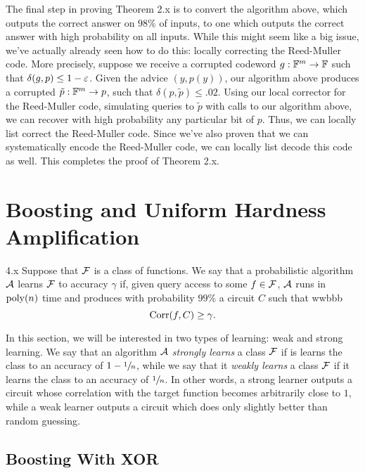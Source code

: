 \documentclass[11pt]{article}
\begin{document}
The final step in proving Theorem 2.x is to convert the algorithm above, which outputs the correct answer on $98$\% of inputs, to one which outputs the correct answer with high probability on all inputs. While this might seem like a big issue, we've actually already seen how to do this: locally correcting the Reed-Muller code. More precisely, suppose we receive a corrupted codeword $g : \mathbb{F}^m \rightarrow \mathbb{F}$ such that $\delta(g, p) \leq 1 - \varepsilon$. Given the advice $(y, p(y))$, our algorithm above produces a corrupted $\tilde{p} : \mathbb{F}^m \rightarrow p$, such that $\delta(p, \tilde{p}) \leq .02$. Using our local corrector for the Reed-Muller code, simulating queries to $\tilde{p}$ with calls to our algorithm above, we can recover with high probability any particular bit of $p$. Thus, we can locally list correct the Reed-Muller code. Since we've also proven that we can systematically encode the Reed-Muller code, we can locally list decode this code as well. This completes the proof of Theorem 2.x.

\section{Boosting and Uniform Hardness Amplification}


\begin{definition}{4.x}
    Suppose that $\mathcal{F}$ is a class of functions. We say that a probabilistic algorithm $\mathcal{A}$ learns $\mathcal{F}$ to accuracy $\gamma$ if, given query access to some $f \in \mathcal{F}$, $\mathcal{A}$ runs in $\mathrm{poly}(n)$ time and produces with probability $99\%$ a circuit $C$ such that wwbbb 
    \begin{equation*}
        \mathrm{Corr}(f, C) \geq \gamma.
    \end{equation*}
\end{definition}

In this section, we will be interested in two types of learning: weak and strong learning. We say that an algorithm $\mathcal{A}$ \emph{strongly learns} a class $\mathcal{F}$ if is learns the class to an accuracy of $1 - \sfrac{1}{n}$, while we say that it \emph{weakly learns} a class $\mathcal{F}$ if it learns the class to an accuracy of $\sfrac{1}{n}$. In other words, a strong learner outputs a circuit whose correlation with the target function becomes arbitrarily close to $1$, while a weak learner outputs a circuit which does only slightly better than random guessing.


\subsection{Boosting With XOR}
\end{document}
